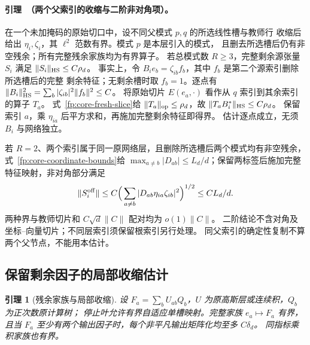 \documentclass[a4paper]{tufte-handout}
\newtheorem{lemma}{引理}
\begin{document}
\begin{fullwidth}
\paragraph{引理~\thelemma（两个父索引的收缩与二阶非对角项）。}
\label{fp:core-two-parent}
在一个未加掩码的原始切口中，设不同父模式 $p,q$ 的所选线性槽与教师行
收缩后给出 $\eta_i,\zeta_i$，其 $\ell^2$ 范数有界。模式 $p$ 是本层引入的模式，
且删去所选槽后仍有非空残余；所有完整残余家族均为有界算子。
若总模式数 $R\ge3$，完整剩余源张量 $S_i$ 满足 $\|S_i\|_{\rm HS}\le C\rho_d$。
事实上，令 $B_ie_b=\zeta_{ib}f_b$，其中 $f_b$ 是第二个源索引删除所选槽后的完整
剩余特征；无剩余槽时取 $f_b=1$。逐点有
$\|B_i\|_{\rm HS}^2=\sum_b|\zeta_{ib}|^2\|f_b\|^2\le C$。
将原始切片 $E(e_a,\cdot)$ 看作从 $q$ 索引到其余索引的算子 $T_a$。
式~\eqref{fp:core-fresh-slice}给 $\|T_a\|_{\rm op}\le\rho_d$，故
$\|T_aB_i^*\|_{\rm HS}\le C\rho_d$。
保留索引 $a$，乘 $\eta_{ia}$ 后平方求和，再施加完整剩余特征即得界。
估计逐点成立，无须 $B_i$ 与网络独立。

若 $R=2$、两个索引属于同一原网络层，且删除所选槽后两个模式均有非空残余，式~\eqref{fp:core-coordinate-bounds}给
$\max_{a\ne b}|D_{ab}|\le L_d/d$；保留两标签后施加完整特征映射，非对角部分满足
\[
 \|S_i^{\rm off}\|\le C\Big(\sum_{a\ne b}|D_{ab}\eta_{ia}\zeta_{ib}|^2\Big)^{1/2}
 \le CL_d/d.
\]
两种界与教师切片和 $C\sqrt d\|C\|$ 配对均为 $o(1)\|C\|$。
二阶结论不含对角及坐标--向量切片；不同层索引须保留根索引另行处理。
同父索引的确定性复制不算两个父节点，不能用本估计。

\subsection{保留剩余因子的局部收缩估计}\label{fp:core-residual-section}

\begin{lemma}[残余家族与局部收缩]\label{fp:core-residual-flat}
\label{fp:core-local-contraction}\label{fp:core-split-hit}
\label{fp:core-hybrid-Rge2}\label{fp:core-hybrid-R1}
设 $F_a=\sum_bU_{ab}Q_b$，$U$ 为原高斯层或连续积，$Q_b$ 为正次数原计算树；
停止叶允许有界自适应单槽映射。完整家族 $e_a\mapsto F_a$ 有界，
且当 $F_a$ 至少有两个输出因子时，每个非平凡输出矩阵化均至多 $C\delta_d$。
同指标乘积家族也有界。


\end{lemma}
\end{fullwidth}
\end{document}
